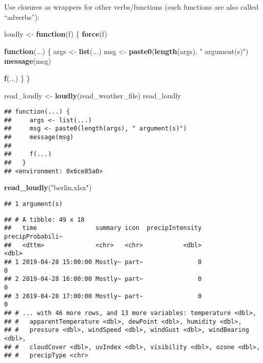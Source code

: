 \documentclass[]{book}
\newenvironment{Shaded}{\begin{snugshade}}{\end{snugshade}}
\newcommand{\ControlFlowTok}[1]{\textcolor[rgb]{0.13,0.29,0.53}{\textbf{#1}}}
\newcommand{\KeywordTok}[1]{\textcolor[rgb]{0.13,0.29,0.53}{\textbf{#1}}}
\newcommand{\NormalTok}[1]{#1}
\newcommand{\StringTok}[1]{\textcolor[rgb]{0.31,0.60,0.02}{#1}}
\begin{document}
Use closures as wrappers for other verbs/functions (such functions are also called ``adverbs''):

\begin{Shaded}
\begin{Highlighting}[]
\NormalTok{loudly <-}\StringTok{ }\ControlFlowTok{function}\NormalTok{(f) \{}
  \KeywordTok{force}\NormalTok{(f)}

  \ControlFlowTok{function}\NormalTok{(...) \{}
\NormalTok{    args <-}\StringTok{ }\KeywordTok{list}\NormalTok{(...)}
\NormalTok{    msg <-}\StringTok{ }\KeywordTok{paste0}\NormalTok{(}\KeywordTok{length}\NormalTok{(args), }\StringTok{" argument(s)"}\NormalTok{)}
    \KeywordTok{message}\NormalTok{(msg)}

    \KeywordTok{f}\NormalTok{(...)}
\NormalTok{  \}}
\NormalTok{\}}

\NormalTok{read_loudly <-}\StringTok{ }\KeywordTok{loudly}\NormalTok{(read_weather_file)}
\NormalTok{read_loudly}
\end{Highlighting}
\end{Shaded}

\begin{verbatim}
## function(...) {
##     args <- list(...)
##     msg <- paste0(length(args), " argument(s)")
##     message(msg)
## 
##     f(...)
##   }
## <environment: 0x6ce85a0>
\end{verbatim}

\begin{Shaded}
\begin{Highlighting}[]
\KeywordTok{read_loudly}\NormalTok{(}\StringTok{"berlin.xlsx"}\NormalTok{)}
\end{Highlighting}
\end{Shaded}

\begin{verbatim}
## 1 argument(s)
\end{verbatim}

\begin{verbatim}
## # A tibble: 49 x 18
##   time                summary icon  precipIntensity precipProbabili~
##   <dttm>              <chr>   <chr>           <dbl>            <dbl>
## 1 2019-04-28 15:00:00 Mostly~ part~               0                0
## 2 2019-04-28 16:00:00 Mostly~ part~               0                0
## 3 2019-04-28 17:00:00 Mostly~ part~               0                0
## # ... with 46 more rows, and 13 more variables: temperature <dbl>,
## #   apparentTemperature <dbl>, dewPoint <dbl>, humidity <dbl>,
## #   pressure <dbl>, windSpeed <dbl>, windGust <dbl>, windBearing <dbl>,
## #   cloudCover <dbl>, uvIndex <dbl>, visibility <dbl>, ozone <dbl>,
## #   precipType <chr>
\end{verbatim}
\end{document}
